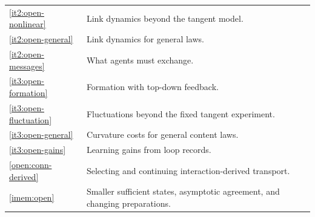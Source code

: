 \begin{longtable}{@{}p{}p{}@{}}
\cref{it2:open-nonlinear} & Link dynamics beyond the tangent model. \\
\cref{it2:open-general} & Link dynamics for general laws. \\
\cref{it2:open-messages} & What agents must exchange. \\
\cref{it3:open-formation} & Formation with top-down feedback. \\
\cref{it3:open-fluctuation} & Fluctuations beyond the fixed tangent experiment. \\
\cref{it3:open-general} & Curvature costs for general content laws. \\
\cref{it3:open-gains} & Learning gains from loop records. \\
\cref{open:conn-derived} & Selecting and continuing interaction-derived transport. \\
\cref{imem:open} & Smaller sufficient states, asymptotic agreement, and changing preparations. \\
\end{longtable}
\endgroup
